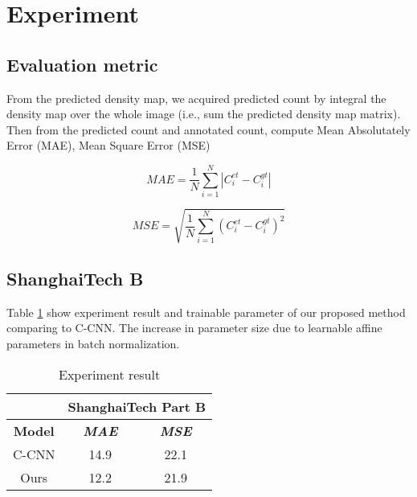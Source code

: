 \section{Experiment}

\subsection{Evaluation metric}


From the predicted density map, we acquired predicted count by integral the density map over the whole image (i.e., sum the predicted density map matrix). Then from the predicted count and annotated count, compute Mean Absolutately Error (MAE), Mean Square Error (MSE) 

\begin{equation}M A E=\frac{1}{N} \sum_{i=1}^{N}\left|C_{i}^{e t}-C_{i}^{g t}\right|\end{equation}

\begin{equation}M S E=\sqrt{\frac{1}{N} \sum_{i=1}^{N}\left(C_{i}^{e t}-C_{i}^{g t}\right)^{2}}\end{equation}

\subsection{ShanghaiTech B}

Table \ref{tab:experiment-result} show experiment result and trainable parameter of our proposed method comparing to C-CNN. The increase in parameter size due to learnable affine parameters in batch normalization.  

\begin{table}[htbp]
\caption{\label{tab:experiment-result}  Experiment result}
\begin{center}
\begin{tabular}{|c|c|c|}
\hline
\textbf{}&\multicolumn{2}{|c|}{\textbf{ShanghaiTech Part B}}\\
\hline
\textbf{Model} & \textbf{\textit{MAE}}& \textbf{\textit{MSE}} \\
\hline
C-CNN & 14.9 & 22.1   \\
\hline
Ours & 12.2 & 21.9  \\
\hline

\end{tabular}

\end{center}
\end{table}


